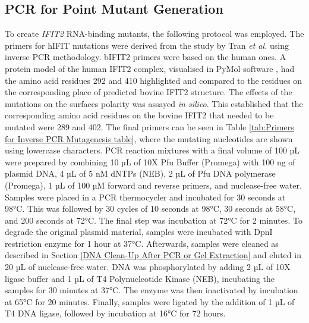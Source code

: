 \subsection{PCR for Point Mutant Generation} \label{subsec:PCR for Point Mutant Generation}
To create \textit{IFIT2} RNA-binding mutants, the following protocol was employed. The primers for hIFIT mutations were derived from the study by Tran \textit{et al.} \cite{Tran2020InfluenzaMRNAs} using inverse PCR methodology. bIFIT2 primers were based on the human ones. A protein model of the human IFIT2 complex, visualised in PyMol software \cite{SchrodingerTeam2023TheSystem}, had the amino acid residues 292 and 410 highlighted and compared to the residues on the corresponding place of predicted bovine IFIT2 structure. The effects of the mutations on the surfaces polarity was assayed \textit{in silico}. This established that the corresponding amino acid residues on the bovine IFIT2 that needed to be mutated were 289 and 402. The final primers can be seen in Table \ref{tab:Primers for Inverse PCR Mutagenesis table}, where the mutating nucleotides are shown using lowercase characters. PCR reaction mixtures with a final volume of 100 µL were prepared by combining 10 µL of 10X Pfu Buffer (Promega) with 100 ng of plasmid DNA, 4 µL of 5 nM dNTPs (NEB), 2 µL of Pfu DNA polymerase (Promega), 1 µL of 100 µM forward and reverse primers, and nuclease-free water. Samples were placed in a PCR thermocycler and incubated for 30 seconds at 98°C. This was followed by 30 cycles of 10 seconds at 98°C, 30 seconds at 58°C, and 200 seconds at 72°C. The final step was incubation at 72°C for 2 minutes. To degrade the original plasmid material, samples were incubated with DpnI restriction enzyme for 1 hour at 37°C. Afterwards, samples were cleaned as described in Section \ref{DNA Clean-Up After PCR or Gel Extraction} and eluted in 20 µL of nuclease-free water. DNA was phosphorylated by adding 2 µL of 10X ligase buffer and 1 µL of T4 Polynucleotide Kinase (NEB), incubating the samples for 30 minutes at 37°C. The enzyme was then inactivated by incubation at 65°C for 20 minutes. Finally, samples were ligated by the addition of 1 µL of T4 DNA ligase, followed by incubation at 16°C for 72 hours.

